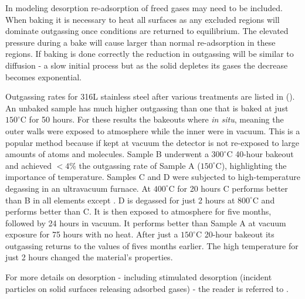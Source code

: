 In modeling desorption re-adsorption of freed gases may need to be included.  When baking it is necessary to heat all surfaces as
any excluded regions will dominate outgassing once conditions are returned to equilibrium.  The elevated pressure during a bake will
cause larger than normal re-adsorption in these regions.  If baking is done correctly the reduction in
outgassing will be similar to diffusion - a slow initial process but as the solid depletes its gases the decrease becomes
exponential.

Outgassing rates for 316L stainless steel after various treatments are listed in
 ().  An unbaked sample has
much higher outgassing than one that is baked at just $150^{\circ}\mathrm{C}$ for 50 hours.  For these results the bakeouts where
\textit{in situ}, meaning the outer walls were exposed to atmosphere while the inner were in vacuum.  This is a popular method because
if kept at vacuum the detector is not re-exposed to large amounts of atoms and molecules.  Sample B underwent a $300^{\circ}\mathrm{C}$
40-hour bakeout and achieved $<4\%$ the  outgassing rate of Sample A ($150^{\circ}\mathrm{C}$), highlighting the importance of
temperature.  Samples C and D
were subjected to high-temperature degassing in an ultravacuum furnace.  At $400^{\circ}\mathrm{C}$ for 20 hours C performs better than B
in all elements except .  D is degassed for just 2 hours at $800^{\circ}\mathrm{C}$ and performs better than C.  It is then
exposed to atmosphere for five months, followed by 24 hours in vacuum.  It performs better than Sample A at vacuum exposure for 75 hours
with no heat.  After just a $150^{\circ}\mathrm{C}$ 20-hour bakeout its outgassing returns to the values of fives months
earlier.  The high temperature for just 2 hours changed the material's properties.

For more details on desorption - including stimulated desorption (incident particles on solid surfaces releasing adsorbed gases) - the
reader is referred to .



